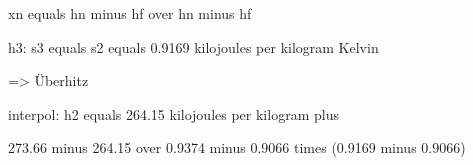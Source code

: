 xn equals hn minus hf over hn minus hf

h3: s3 equals s2 equals 0.9169 kilojoules per kilogram Kelvin

=> Überhitz

interpol: h2 equals 264.15 kilojoules per kilogram plus

273.66 minus 264.15 over 0.9374 minus 0.9066 times (0.9169 minus 0.9066)